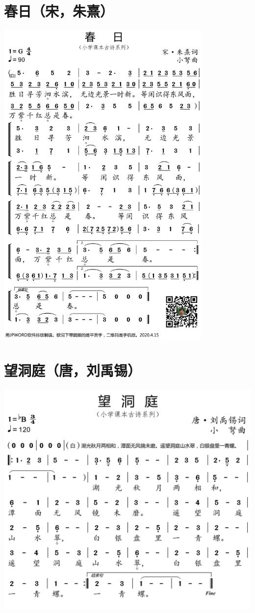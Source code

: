 \documentclass[cn,pad,twocol]{elegantbook}
\begin{document}
\section{春日（宋，朱熹）}
    \includegraphics[width=0.8\textwidth]{dongxiao/20200627-古诗-春日.jpg}   
\section{望洞庭（唐，刘禹锡）}
    \includegraphics[width=\textwidth]{dongxiao/20200627-古诗-望洞庭.jpg}   
\end{document}
